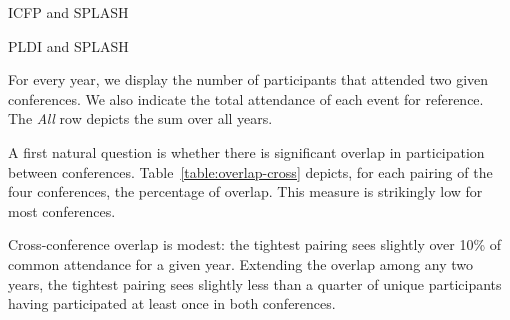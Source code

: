 \begin{table}
  \begin{subtable}[!t]{0.48\textwidth}
    \centering
    \caption{ICFP and SPLASH}
  \end{subtable}
  \hspace{\fill}
  \begin{subtable}[!t]{0.48\textwidth}
    \centering
    \caption{PLDI and SPLASH}
  \end{subtable}
  \caption{For every year, we display the number of participants that attended two given conferences.
    We also indicate the total attendance of each event for reference.
    The \emph{All} row depicts the sum over all years.}
  \label{table:overlap-cross}
\end{table}

A first natural question is whether there is significant overlap
in participation between conferences.
Table~\ref{table:overlap-cross} depicts, for each pairing of the four
conferences, the percentage of overlap. This measure is strikingly
low for most conferences.

\begin{obs}
Cross-conference overlap is modest: the tightest pairing sees slightly over
10\% of common attendance for a given year. Extending the overlap among any
two years, the tightest pairing sees slightly less than a quarter of unique
participants having participated at least once in both conferences.
  \label{obs:overlap-cross}
\end{obs}

